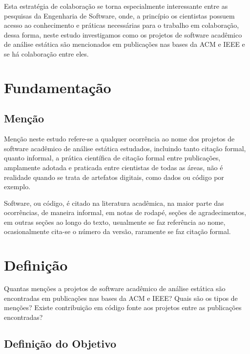Esta estratégia de colaboração se torna especialmente interessante entre as
pesquisas da Engenharia de Software, onde, a princípio os cientistas possuem
acesso ao conhecimento e práticas necessárias para o trabalho em colaboração,
dessa forma, neste estudo investigamos como os projetos de software acadêmico
de análise estática são mencionados em publicações nas bases da ACM e IEEE e se
há colaboração entre eles.



\section{Fundamentação} \label{estudo2:fundamentacao} %

\subsection{Menção}

Menção neste estudo refere-se a qualquer ocorrência ao nome dos projetos de
software acadêmico de análise estática estudados, incluindo tanto citação
formal, quanto informal, a prática científica de citação formal entre
publicações, amplamente adotada e praticada entre cientistas de todas as áreas,
não é realidade quando se trata de artefatos digitais, como dados ou
código por exemplo.

Software, ou código, é citado na literatura acadêmica, na maior parte das
ocorrências, de maneira informal, em notas de rodapé, seções de agradecimentos,
em outras seções ao longo do texto, usualmente se faz referência ao nome,
ocasionalmente cita-se o número da versão, raramente se faz citação formal.


\section{Definição} \label{estudo2:definicao} %

Quantas menções a projetos de software acadêmico de análise estática são
encontradas em publicações nas bases da ACM e IEEE? Quais são os tipos de
menções? Existe contribuição em código fonte aos projetos entre as publicações
encontradas?

\subsection{Definição do Objetivo}

